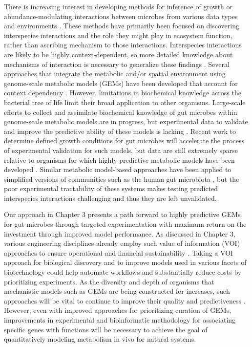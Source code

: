 \documentclass[11pt,twocolumn,notitlepage,openany,twoside]{book}
\begin{document}
\begin{refsection}
There is increasing interest in developing methods for inference of growth or abundance-modulating interactions between microbes from various data types and environments \cite{Friedman2017-zn,Weiss2016-tq,Xiao2017-yl}. These methods have primarily been focused on discovering interspecies interactions and the role they might play in ecosystem function, rather than ascribing mechanism to those interactions. Interspecies interactions are likely to be highly context-dependent, so more detailed knowledge about mechanisms of interaction is necessary to generalize these findings \cite{Chamberlain2014-nt}. Several approaches that integrate the metabolic and/or spatial environment using genome-scale metabolic models (GEMs) have been developed that account for context dependency \cite{Chan2017-tk,Harcombe2014-ev,Zomorrodi2012-ja}. However, limitations in biochemical knowledge across the bacterial tree of life limit their broad application to other organisms. Large-scale efforts to collect and assimilate biochemical knowledge of gut microbes within genome-scale metabolic models are in progress, but experimental data to validate and improve the predictive ability of these models is lacking \cite{Magnusdottir2017-dk}. Recent work to determine defined growth conditions for gut microbes will accelerate the process of experimental validation for such models, but data are still extremely sparse relative to organisms for which highly predictive metabolic models have been developed \cite{Tramontano2018-xz}. Similar metabolic model-based approaches have been applied to simplified versions of communities such as the human gut microbiota \cite{Bauer2017-kf,Chan2017-tk}, but the poor experimental tractability of these systems makes testing predicted interspecies interactions challenging and thus they are left unvalidated.

Our approach in Chapter 3 presents a path forward to highly predictive GEMs for gut microbes through targeted experimentation with maximum return on the investment through improved model performance. As discussed in Chapter 3, various engineering disciplines already employ such value of information (VOI) approaches to ensure operational and financial sustainability \cite{He2018-nb}. Taking a VOI approach for biological discovery and to improve models used in various facets of biotechnology could help automate workflows and substantially reduce costs by prioritizing experiments. As the diversity and depth of organisms that mechanistic models such as GEMs are being constructed for increases, such approaches will be vital to continue to improve their quality and predictiveness \cite{Magnusdottir2017-dk,Monk2014-fa}. However, even with improved approaches for prioritizing curation of GEMs, improvements in experimental and bioinformatic methodology for associating specific genes with functions will be necessary to achieve the goal of quantitatively modeling metabolism in vivo for natural systems.


\end{refsection}
\end{document}
